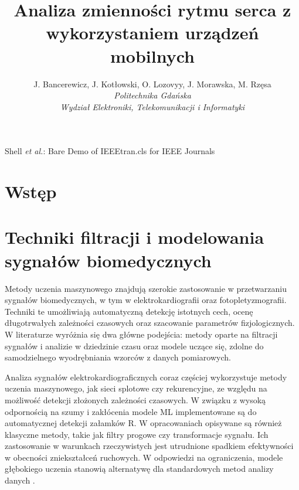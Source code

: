 \documentclass[journal]{IEEEtran}
\begin{document}
\title{Analiza zmienności rytmu serca z wykorzystaniem urządzeń mobilnych}
\author{
    J. Bancerewicz, J. Kotłowski, O. Lozovyy, J. Morawska, M. Rzęsa\\
    \textit{Politechnika Gdańska}\\
    \textit{Wydział Elektroniki, Telekomunikacji i Informatyki}
}


\markboth{}%
{Shell \MakeLowercase{\textit{et al.}}: Bare Demo of IEEEtran.cls for IEEE Journals}
\maketitle




\section{Wstęp}


\newpage
\section{Techniki filtracji i modelowania sygnałów biomedycznych}

Metody uczenia maszynowego znajdują szerokie zastosowanie w przetwarzaniu sygnałów biomedycznych, w tym w elektrokardiografii oraz fotopletyzmografii. Techniki te umożliwiają automatyczną detekcję istotnych cech, ocenę długotrwałych zależności czasowych oraz szacowanie parametrów fizjologicznych. W literaturze wyróżnia się dwa główne podejścia: metody oparte na filtracji sygnałów i analizie w dziedzinie czasu oraz modele uczące się, zdolne do samodzielnego wyodrębniania wzorców z danych pomiarowych.

Analiza sygnałów elektrokardiograficznych coraz częściej wykorzystuje metody uczenia maszynowego, jak sieci splotowe czy rekurencyjne, ze względu na możliwość detekcji złożonych zależności czasowych. W związku z wysoką odpornością na szumy i zakłócenia modele ML implementowane są do automatycznej detekcji załamków R. W opracowaniach opisywane są również klasyczne metody, takie jak filtry progowe czy transformacje sygnału. Ich zastosowanie w warunkach rzeczywistych jest utrudnione spadkiem efektywności w obecności zniekształceń ruchowych. W odpowiedzi na ograniczenia, modele głębokiego uczenia stanowią alternatywę dla standardowych metod analizy danych \cite{1}.
\end{document}
